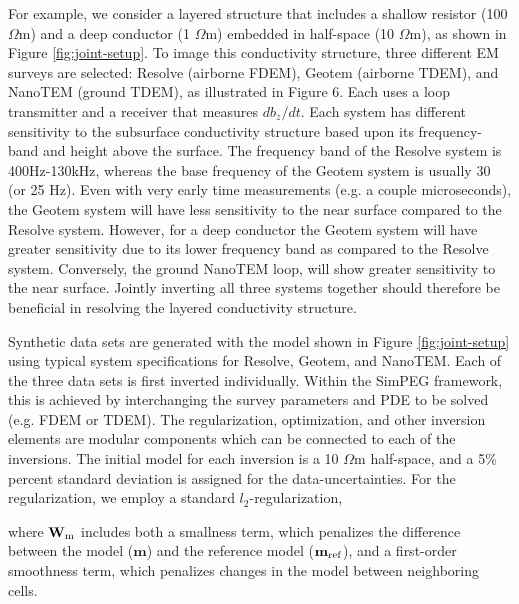 \documentclass[paper]{geophysics}
\begin{document}
For example, we consider a layered structure that includes a shallow resistor (100 $\Omega$m) and a deep conductor (1 $\Omega$m) embedded in half-space (10 $\Omega$m), as shown in Figure \ref{fig:joint-setup}. To image this conductivity structure, three different EM surveys are selected: Resolve (airborne FDEM), Geotem (airborne TDEM), and NanoTEM (ground TDEM), as illustrated in Figure 6. Each uses a loop transmitter and a receiver that measures $db_z/dt$. Each system has different sensitivity to the subsurface conductivity structure based upon its frequency-band and height above the surface. The frequency band of the Resolve system is 400Hz-130kHz, whereas the base frequency of the Geotem system is usually 30 (or 25 Hz). Even with very early time measurements (e.g. a couple microseconds), the Geotem system will have less sensitivity to the near surface compared to the Resolve system. However, for a deep conductor the Geotem system will have greater sensitivity due to its lower frequency band as compared to the Resolve system. Conversely, the ground NanoTEM loop, will show greater sensitivity to the near surface. Jointly inverting all three systems together should therefore be beneficial in resolving the layered conductivity structure.





Synthetic data sets are generated with the model shown in Figure \ref{fig:joint-setup} using  typical system specifications for Resolve, Geotem, and NanoTEM. Each of the three data sets is first inverted individually. Within the SimPEG framework, this is achieved by interchanging the survey parameters and PDE to be solved (e.g. FDEM or TDEM). The regularization, optimization, and other inversion elements are modular components which can be connected to each of the inversions. The initial model for each inversion is a 10 $\Omega$m half-space, and a 5\% percent standard deviation is assigned for the data-uncertainties. For the regularization, we employ a standard $l_2$-regularization,

where $\mathbf{W}_{\rm m}$ includes both a smallness term, which penalizes the difference between the model ($\mathbf{m}$) and the reference model ($\mathbf{m}_{\rm ref}$), and a first-order smoothness term, which penalizes changes in the model between neighboring cells.
\end{document}
